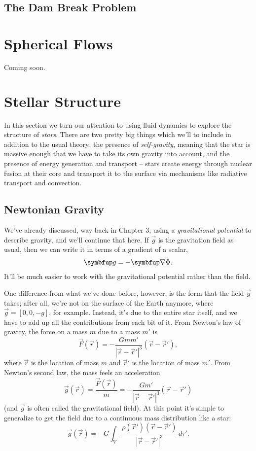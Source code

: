 \subsection{The Dam Break Problem}


%
% 


\section{Spherical Flows}

Coming soon.

%
% 

\section{Stellar Structure}

In this section we turn our attention to using fluid dynamics to explore the structure of \emph{stars}.  There are two pretty big things which we'll to include in addition to the usual theory:  the presence of \emph{self-gravity}, meaning that the star is massive enough that we have to take its own gravity into account, and the presence of energy generation and transport -- stars create energy through nuclear fusion at their core and transport it to the surface via mechanisms like radiative transport and convection.

\subsection{Newtonian Gravity}

We've already discussed, way back in Chapter 3, using a \emph{gravitational potential} to describe gravity, and we'll continue that here.  If $\vec{g}$ is the gravitation field as usual, then we can write it in terms of a gradient of a scalar,
\begin{equation}
\vec{g} = -\grad \Phi.
\end{equation}
It'll be much easier to work with the gravitational potential rather than the field.  

One difference from what we've done before, however, is the form that the field $\vec{g}$ takes; after all, we're not on the surface of the Earth anymore, where $\vec{g} = [0, 0, -g]$, for example.  Instead, it's due to the entire star itself, and we have to add up all the contributions from each bit of it.  From Newton's law of gravity, the force on a mass $m$ due to a mass $m'$ is 
\[
\vec{F}(\vec{r}) = -\frac{G m m'}{|\vec{r} - \vec{r}'|^3} (\vec{r} - \vec{r}'),
\]
where $\vec{r}$ is the location of mass $m$ and $\vec{r}'$ is the location of mass $m'$.  From Newton's second law, the mass feels an acceleration
\[
\vec{g}(\vec{r}) = \frac{\vec{F}(\vec{r})}{m} = -\frac{G m'}{|\vec{r} - \vec{r}'|^3} (\vec{r} - \vec{r}')
\]
(and $\vec{g}$ is often called the gravitational field).  At this point it's simple to generalize to get the field due to a continuous mass distribution like a star:
\begin{equation}
\vec{g}(\vec{r}) = -G \int_V \frac{ \rho(\vec{r}') (\vec{r} - \vec{r}')}{|\vec{r} - \vec{r}'|^3} \, d\tau'.
\end{equation}

